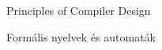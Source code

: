 \begin{thebibliography}{x}

Principles of Compiler Design

Formális nyelvek és automaták

\end{thebibliography}
